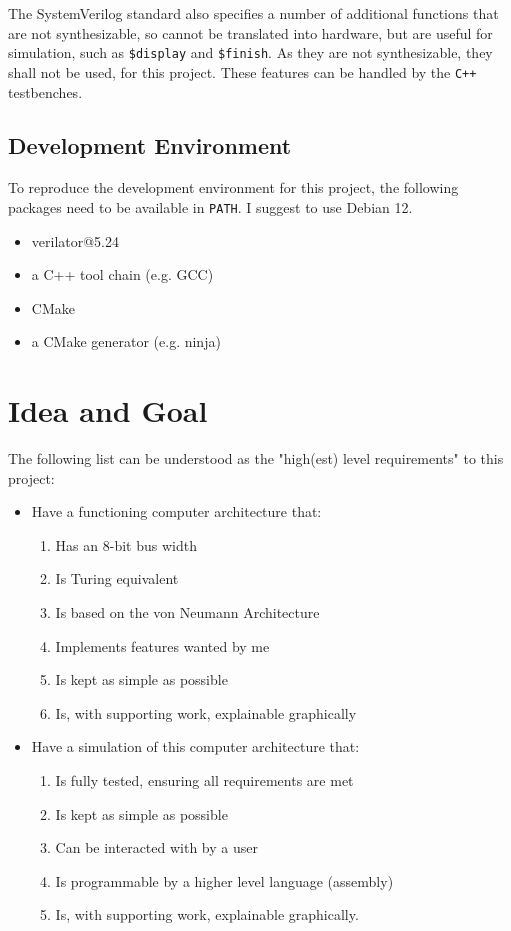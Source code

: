The SystemVerilog standard also specifies a number of additional functions that are not synthesizable, so cannot be translated into hardware, but are useful for simulation, such as \texttt{\$display} and \texttt{\$finish}. As they are not synthesizable, they shall not be used, for this project. These features can be handled by the \texttt{C++} testbenches.

\cite{verilogcourse}

\subsection{Development Environment}
To reproduce the development environment for this project, the following packages need to be available in \texttt{PATH}. I suggest to use Debian 12. 

\begin{itemize}
  \item verilator@5.24
  \item a C++ tool chain (e.g. GCC)
  \item CMake
  \item a CMake generator (e.g. ninja)
\end{itemize}  

\section{Idea and Goal} \label{sec:goal}  
The following list can be understood as the "high(est) level requirements" to this project:
\begin{itemize}
  \item Have a functioning computer architecture that:
 \begin{enumerate}
    \item Has an 8-bit bus width
    \item Is Turing equivalent
    \item Is based on the von Neumann Architecture
    \item Implements features wanted by me
    \item Is kept as simple as possible
    \item Is, with supporting work, explainable graphically
  \end{enumerate}
  \item Have a simulation of this computer architecture that: 
  \begin{enumerate}
    \item Is fully tested, ensuring all requirements are met
    \item Is kept as simple as possible
    \item Can be interacted with by a user
    \item Is programmable by a higher level language (assembly)
    \item Is, with supporting work, explainable graphically.
  \end{enumerate}
\end{itemize}

